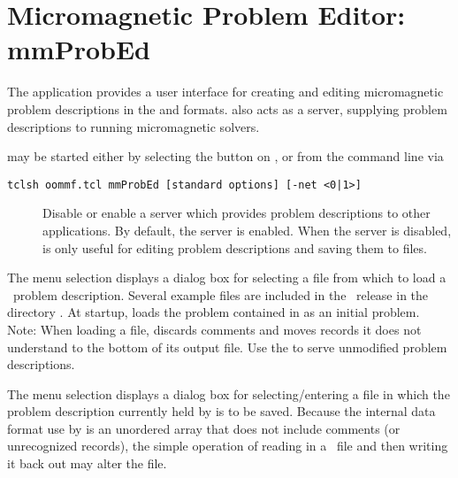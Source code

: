 \chapter{Micromagnetic Problem Editor: mmProbEd}\label{sec:mmprobed}

\begin{center}
\end{center}

The application  provides a
user interface for creating and editing micromagnetic problem
descriptions in the  and
 formats.  
also acts as a server, supplying problem descriptions to running
 micromagnetic solvers.

 may be started either by selecting the
 button on , or
from the command line via
\begin{verbatim}
tclsh oommf.tcl mmProbEd [standard options] [-net <0|1>]
\end{verbatim}

\begin{description}
\item[]
  Disable or enable a server which provides problem descriptions
  to other applications.  By default, the server is enabled.  When
  the server is disabled,  is only useful for editing
  problem descriptions and saving them to files.
\end{description}

The menu selection  displays a dialog box
for selecting a file from which to load a \MIF\ problem 
description.  Several example files are included in the 
\OOMMF\ release in the directory .
At startup,  loads the problem contained in
 as an initial problem.  Note: When loading
a file,  discards comments and moves records it does not
understand to the bottom of its output file.  Use the
 to serve unmodified problem descriptions.

The menu selection  displays a dialog box for
selecting/entering a file in which the problem description currently
held by  is to be saved.  Because the internal data format
use by  is an unordered array that does not include
comments (or unrecognized records), the simple operation of reading in a
\MIF\ file and then writing it back out may alter the file.

